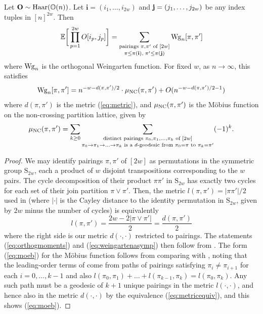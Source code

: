 \documentclass[10pt,reqno]{amsart}
\def\E{\mathbb{E}}
\def\bi{\mathbf{i}}
\def\Haar{\operatorname{Haar}}
\def\OO{\mathbb{O}}
\begin{document}
\begin{lemma}\label{lem:weingarten}
Let $\Ob \sim \Haar(\OO(n))$. Let $\bi=(i_1,\ldots,i_{2w})$ and
$\mathbf{j}=(j_1,\ldots,j_{2w})$ be any index tuples in $[n]^{2w}$. Then
\begin{equation}\label{eq:orthogmoments}
\E\bigg[\prod_{p=1}^{2w} O[i_p,j_p]\bigg]
=\mathop{\sum_{\text{pairings } \pi,\pi' \text{ of } [2w]}}_{\pi \leq
\pi(\bi),\;\pi' \leq \pi(\bj)} \Wg_n[\pi,\pi']
\end{equation}
where $\operatorname{Wg}_n$ is the orthogonal Weingarten function. For fixed $w$,
as $n \to \infty$, this satisfies
\begin{equation}\label{eq:weingartenasymp}
\operatorname{Wg}_n[\pi,\pi']=n^{-w-d(\pi,\pi')/2} \cdot \mu_{\mathrm{NC}}(\pi,\pi')
+O(n^{-w-d(\pi,\pi')/2-1})
\end{equation}
where $d(\pi,\pi')$ is the metric (\ref{eq:metric}), and $\mu_{\mathrm{NC}}(\pi,\pi')$ is
the M\"obius function on the non-crossing partition lattice, given by
\begin{equation}\label{eq:moeb}
\mu_{\mathrm{NC}}(\pi,\pi')=\sum_{k \geq 0}
\mathop{\sum_{\text{distinct pairings } \pi_0,\pi_1,\ldots,\pi_k \text{ of }
[2w]}}_{\pi_0 \to \pi_1 \to
\ldots \to \pi_k \text{ is a } d\text{-geodesic from }
\pi_0=\pi \text{ to } \pi_k=\pi'} (-1)^k.
\end{equation}
\end{lemma}
\begin{proof}
We may identify pairings $\pi,\pi'$ of $[2w]$ as permutations in
the symmetric group $\mathrm{S}_{2w}$, each a product of $w$ disjoint
transpositions corresponding to the $w$ pairs.
The cycle decomposition of their product $\pi\pi'$ in $\mathrm{S}_{2w}$
has exactly two cycles for each set of their join partition
$\pi \vee \pi'$. Then, the metric $l(\pi,\pi')=|\pi\pi'|/2$ used in
\cite[Section 3]{collins2006integration} (where $|\cdot|$ is the Cayley distance
to the identity permutation in $\mathrm{S}_{2w}$, given by $2w$ minus the number
of cycles) is equivalently
\begin{equation}\label{eq:metricequiv}
l(\pi,\pi')=\frac{2w-2|\pi \vee \pi'|}{2}=\frac{d(\pi,\pi')}{2}
\end{equation}
where the right side is our metric $d(\cdot,\cdot)$ restricted to pairings. The
statements (\ref{eq:orthogmoments}) and (\ref{eq:weingartenasymp}) then follow
from \cite[Corollary 3.4 and Theorem 3.13]{collins2006integration}.
The form (\ref{eq:moeb}) for the M\"obius function follows from comparing
\cite[Theorem 3.13]{collins2006integration} with \cite[Lemma
3.12]{collins2006integration}, noting that the leading-order terms of
\cite[Lemma 3.12]{collins2006integration} come from paths of pairings
satisfying $\pi_i \neq \pi_{i+1}$ for each $i=0,\ldots,k-1$
and also 
$l(\pi_0,\pi_1)+\ldots+l(\pi_{k-1},\pi_k)=l(\pi_0,\pi_k)$. Any such path must
be a geodesic of $k+1$ unique pairings in the metric $l(\cdot,\cdot)$, and
hence also in the metric $d(\cdot,\cdot)$ by the equivalence
(\ref{eq:metricequiv}), and this shows (\ref{eq:moeb}).
\end{proof}
\end{document}
